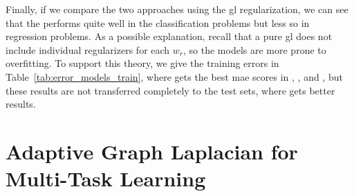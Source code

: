 %
Finally, if we compare the two approaches using the \acrshort{gl} regularization, we can see that the  performs quite well in the classification problems but less so in regression problems. As a possible explanation, recall that a pure \acrshort{gl} does not include individual regularizers for each $w_r$, so the models are more prone to overfitting. To support this theory, we give the training errors in Table~\ref{tab:error_models_train}, where  gets the best \acrshort{mae} scores in , ,  and , but these results are not transferred completely to the test sets, where  gets better results.
%

























\section{Adaptive Graph Laplacian for Multi-Task Learning}\label{sec:adapconvexgl_experiments}


